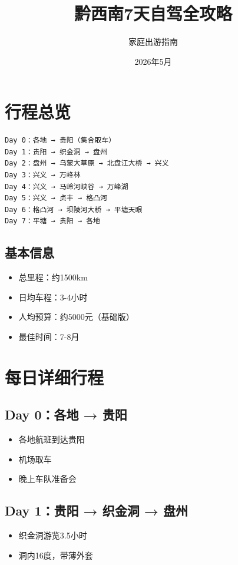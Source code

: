 \documentclass[12pt,a4paper,UTF8]{ctexart}
\title{\Huge 黔西南7天自驾全攻略}
\author{家庭出游指南}
\date{2026年5月}
\begin{document}
\maketitle
\thispagestyle{empty}
\newpage
\tableofcontents
\newpage

\section{行程总览}

\begin{verbatim}
Day 0：各地 → 贵阳（集合取车）
Day 1：贵阳 → 织金洞 → 盘州
Day 2：盘州 → 乌蒙大草原 → 北盘江大桥 → 兴义
Day 3：兴义 → 万峰林
Day 4：兴义 → 马岭河峡谷 → 万峰湖
Day 5：兴义 → 贞丰 → 格凸河
Day 6：格凸河 → 坝陵河大桥 → 平塘天眼
Day 7：平塘 → 贵阳 → 各地
\end{verbatim}

\subsection{基本信息}
\begin{itemize}
\item 总里程：约1500km
\item 日均车程：3-4小时
\item 人均预算：约5000元（基础版）
\item 最佳时间：7-8月
\end{itemize}

\section{每日详细行程}

\subsection{Day 0：各地 → 贵阳}
\begin{itemize}
\item 各地航班到达贵阳
\item 机场取车
\item 晚上车队准备会
\end{itemize}

\subsection{Day 1：贵阳 → 织金洞 → 盘州}
\begin{itemize}
\item 织金洞游览3.5小时
\item 洞内16度，带薄外套
\end{itemize}
\end{document}
